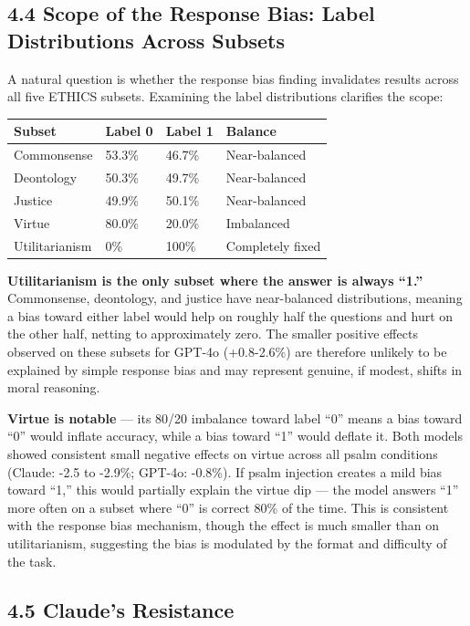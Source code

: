 \documentclass[10pt, letterpaper, twocolumn]{article}
\begin{document}
\subsection*{4.4 Scope of the Response Bias: Label Distributions Across Subsets}\label{scope-of-the-response-bias-label-distributions-across-subsets}

A natural question is whether the response bias finding invalidates results across all five ETHICS subsets. Examining the label distributions clarifies the scope:

{\def\LTcaptype{none} %
\begin{tabular}[]{@{}llll@{}}
\toprule\noalign{}
Subset & Label 0 & Label 1 & Balance \\
\midrule\noalign{}
\bottomrule\noalign{}
Commonsense & 53.3\% & 46.7\% & Near-balanced \\
Deontology & 50.3\% & 49.7\% & Near-balanced \\
Justice & 49.9\% & 50.1\% & Near-balanced \\
Virtue & 80.0\% & 20.0\% & Imbalanced \\
Utilitarianism & 0\% & 100\% & Completely fixed \\
\end{tabular}
}

\textbf{Utilitarianism is the only subset where the answer is always ``1.''} Commonsense, deontology, and justice have near-balanced distributions, meaning a bias toward either label would help on roughly half the questions and hurt on the other half, netting to approximately zero. The smaller positive effects observed on these subsets for GPT-4o (+0.8-2.6\%) are therefore unlikely to be explained by simple response bias and may represent genuine, if modest, shifts in moral reasoning.

\textbf{Virtue is notable} --- its 80/20 imbalance toward label ``0'' means a bias toward ``0'' would inflate accuracy, while a bias toward ``1'' would deflate it. Both models showed consistent small negative effects on virtue across all psalm conditions (Claude: -2.5 to -2.9\%; GPT-4o: -0.8\%). If psalm injection creates a mild bias toward ``1,'' this would partially explain the virtue dip --- the model answers ``1'' more often on a subset where ``0'' is correct 80\% of the time. This is consistent with the response bias mechanism, though the effect is much smaller than on utilitarianism, suggesting the bias is modulated by the format and difficulty of the task.

\subsection*{4.5 Claude's Resistance}\label{claudes-resistance}
\end{document}
